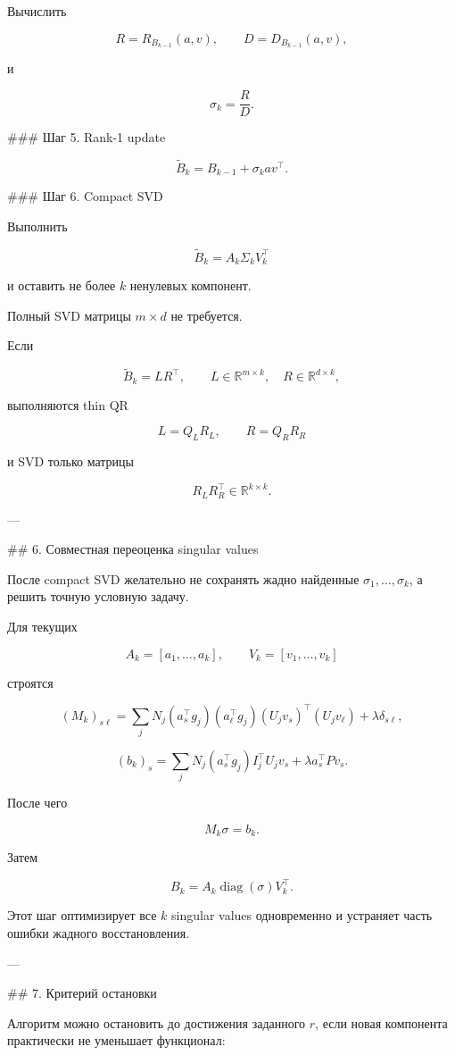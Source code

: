 Вычислить

\[
R=
R_{B_{k-1}}(a,v),
\qquad
D=
D_{B_{k-1}}(a,v),
\]

и

\[
\boxed{
\sigma_k=\frac RD.
}
\]

### Шаг 5. Rank-1 update

\[
\widetilde B_k
=
B_{k-1}
+
\sigma_kav^\top.
\]

### Шаг 6. Compact SVD

Выполнить

\[
\widetilde B_k
=
A_k\Sigma_kV_k^\top
\]

и оставить не более \(k\) ненулевых компонент.

Полный SVD матрицы \(m\times d\) не требуется.

Если

\[
\widetilde B_k=LR^\top,
\qquad
L\in\mathbb R^{m\times k},
\quad
R\in\mathbb R^{d\times k},
\]

выполняются thin QR

\[
L=Q_LR_L,
\qquad
R=Q_RR_R
\]

и SVD только матрицы

\[
R_LR_R^\top\in\mathbb R^{k\times k}.
\]

---

## 6. Совместная переоценка singular values

После compact SVD желательно не сохранять жадно найденные \(\sigma_1,\ldots,\sigma_k\), а решить точную условную задачу.

Для текущих

\[
A_k=[a_1,\ldots,a_k],
\qquad
V_k=[v_1,\ldots,v_k]
\]

строятся

\[
(M_k)_{s\ell}
=
\sum_j
N_j
(a_s^\top g_j)
(a_\ell^\top g_j)
(U_jv_s)^\top(U_jv_\ell)
+
\lambda\delta_{s\ell},
\]

\[
(b_k)_s
=
\sum_j
N_j
(a_s^\top g_j)
I_j^\top U_jv_s
+
\lambda a_s^\top Pv_s.
\]

После чего

\[
\boxed{
M_k\sigma=b_k.
}
\]

Затем

\[
B_k
=
A_k\operatorname{diag}(\sigma)V_k^\top.
\]

Этот шаг оптимизирует все \(k\) singular values одновременно и устраняет часть ошибки жадного восстановления.

---

## 7. Критерий остановки

Алгоритм можно остановить до достижения заданного \(r\), если новая компонента практически не уменьшает функционал:

